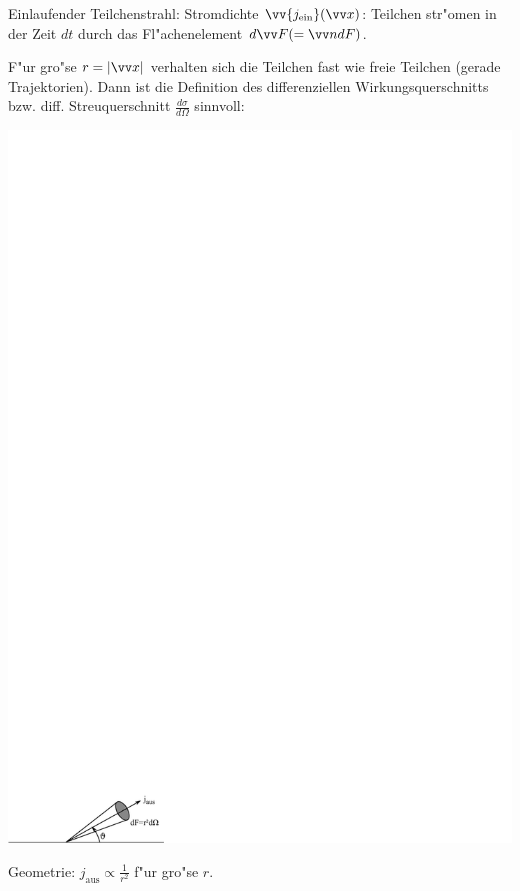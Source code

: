 \documentclass[a4paper]{scrartcl}
\begin{document}
Einlaufender Teilchenstrahl: Stromdichte $\vv{j_\mathrm{ein}}(\vv x)$:
Teilchen str"omen in der Zeit $dt$ durch das Fl"achenelement $d \vv F ( = \vv n dF)$.

F"ur gro"se $r= \vert \vv x \vert$ verhalten sich die Teilchen fast wie freie Teilchen (gerade Trajektorien). Dann ist die Definition des differenziellen Wirkungsquerschnitts bzw. diff. Streuquerschnitt $\frac{d \sigma}{d \Omega}$ sinnvoll:
\begin{center}
\includegraphics{470wirkquer}
\end{center}
Geometrie: $j_\mathrm{aus} \propto \frac1{r^2}$ f"ur gro"se $r$.
\end{document}
